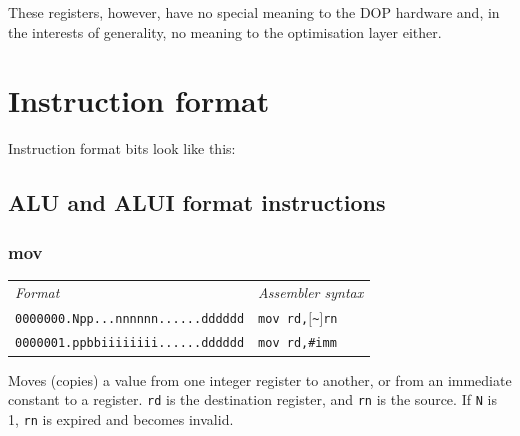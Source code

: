 These registers, however, have no special meaning to the DOP hardware and, in the interests of generality, no meaning to the optimisation layer either.

\section{Instruction format}

Instruction format bits look like this:

\vspace{0.3cm}
{\par}

{\centering {} \par}
\vspace{0.3cm}


\subsection{ALU and ALUI format instructions}

\newcommand{\decfmt}{
\begin{tabular}{ll}
\textit{Format} & \textit{Assembler syntax} \\[0.5ex]
}

\newcommand{\finfmt}{
\end{tabular}
}

\newcommand{\nex}[1]{$[$\textasciitilde$]$\texttt{#1}}

\subsubsection{mov}

\decfmt
\texttt{0000000.Npp...nnnnnn......dddddd} & \texttt{mov rd,\nex{rn}}\\
\texttt{0000001.ppbbiiiiiiii......dddddd} & \texttt{mov rd,\#imm}
\finfmt

Moves (copies) a value from one integer register to another, or from an immediate constant to a register. \texttt{rd} is the destination register, and \texttt{rn} is the source. If \texttt{N} is 1, \texttt{rn} is expired and becomes invalid.

